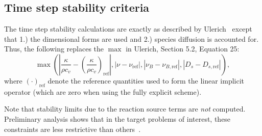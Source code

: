 \subsection{Time step stability criteria}
\label{sec:stabilitycriteria}
The time step stability calculations are exactly as described by
Ulerich~\cite{Ulerich_SZPerfect} except that 1.) the dimensional forms
are used and 2.)  species diffusion is accounted for.  Thus, the
following replaces the $\max$ in Ulerich, Section 5.2, Equation 25:
%
\begin{equation*}
\max \left(
        \left|\frac{\kappa}{\rho c_v} - \left( \frac{\kappa}{\rho c_v} \right)_{\mathrm{ref}} \right|,
        \left|\nu-\nu_{\mathrm{ref}} \right|,
        \left|\nu_{B}-\nu_{B,\mathrm{ref}}\right|,
        \left|D_s-D_{s,\mathrm{ref}}\right|
     \right),
\end{equation*}
% 
where $(\cdot)_{\mathrm{ref}}$ denote the reference quantities used
to form the linear implicit operator (which are zero when using the
fully explicit scheme).

Note that stability limits due to the reaction source terms are
\emph{not} computed.  Preliminary analysis shows that in the target
problems of interest, these constraints are less restrictive than
others~\cite{?}. 

